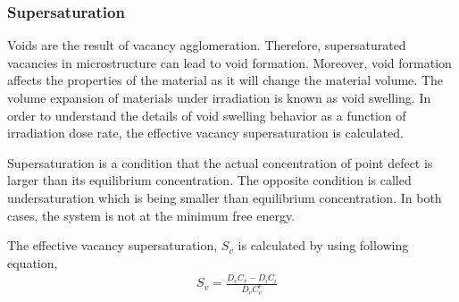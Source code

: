 \documentclass[a4paper]{article}
\begin{document}
    \newpage
    \subsubsection{Supersaturation} \hspace{10pt}
    Voids are the result of vacancy agglomeration. Therefore,  supersaturated vacancies in microstructure can lead to void formation. Moreover, void formation affects the properties of the material as it will change the material volume. The volume expansion of materials under irradiation is known as void swelling. In order to understand the details of void swelling behavior as a function of irradiation dose rate, the effective vacancy supersaturation is calculated.

    Supersaturation is a condition that the actual concentration of point defect is larger than its equilibrium concentration. The opposite condition is called undersaturation which is being smaller than equilibrium concentration. In both cases, the system is not at the minimum free energy.

    The effective vacancy supersaturation, ${S_v}$ is calculated by using following equation, \cite{was2016}\\

    \begin{equation}
      \begin{aligned}
        &S_v=\frac{D_vC_v-D_iC_i}{D_vC_v^e}\\
      \end{aligned}
    \end{equation}\\
\end{document}

